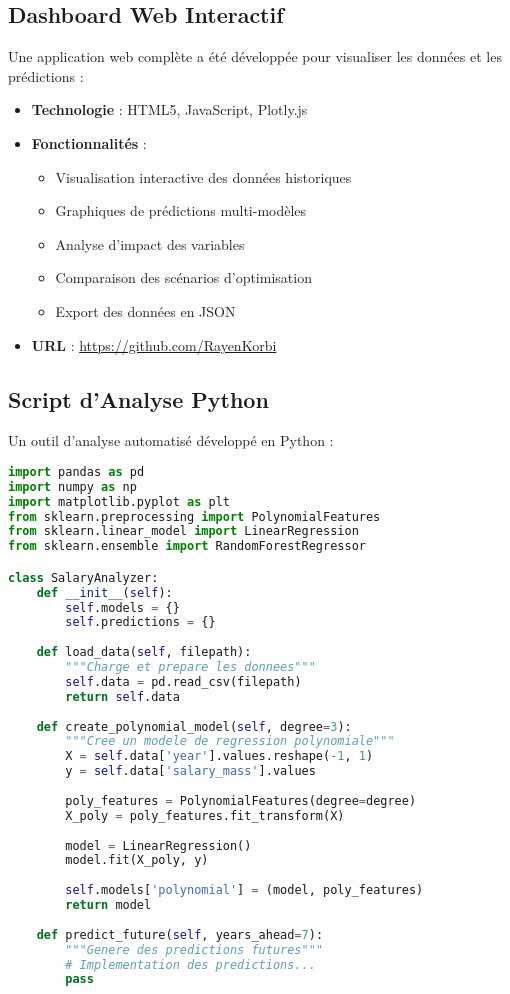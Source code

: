 \documentclass[12pt,a4paper]{article}
\begin{document}
\subsection{Dashboard Web Interactif}
Une application web complète a été développée pour visualiser les données et les prédictions :

\begin{itemize}
    \item \textbf{Technologie} : HTML5, JavaScript, Plotly.js
    \item \textbf{Fonctionnalités} :
    \begin{itemize}
        \item Visualisation interactive des données historiques
        \item Graphiques de prédictions multi-modèles
        \item Analyse d'impact des variables
        \item Comparaison des scénarios d'optimisation
        \item Export des données en JSON
    \end{itemize}
    \item \textbf{URL} : \href{https://github.com/RayenKorbi}{https://github.com/RayenKorbi}
\end{itemize}

\subsection{Script d'Analyse Python}
Un outil d'analyse automatisé développé en Python :

\begin{lstlisting}[language=Python, caption=Extrait du script d'analyse principale]
import pandas as pd
import numpy as np
import matplotlib.pyplot as plt
from sklearn.preprocessing import PolynomialFeatures
from sklearn.linear_model import LinearRegression
from sklearn.ensemble import RandomForestRegressor

class SalaryAnalyzer:
    def __init__(self):
        self.models = {}
        self.predictions = {}
    
    def load_data(self, filepath):
        """Charge et prepare les donnees"""
        self.data = pd.read_csv(filepath)
        return self.data
    
    def create_polynomial_model(self, degree=3):
        """Cree un modele de regression polynomiale"""
        X = self.data['year'].values.reshape(-1, 1)
        y = self.data['salary_mass'].values
        
        poly_features = PolynomialFeatures(degree=degree)
        X_poly = poly_features.fit_transform(X)
        
        model = LinearRegression()
        model.fit(X_poly, y)
        
        self.models['polynomial'] = (model, poly_features)
        return model
    
    def predict_future(self, years_ahead=7):
        """Genere des predictions futures"""
        # Implementation des predictions...
        pass
\end{lstlisting}
\end{document}
